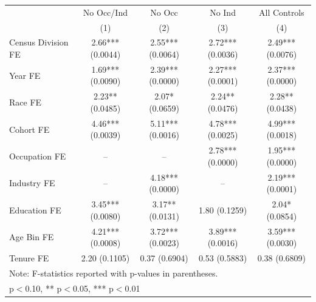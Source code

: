 \begin{tabular}{lcccc}
\hline\hline
 & No Occ/Ind & No Occ & No Ind & All Controls \\
 & (1) & (2) & (3) & (4) \\
\hline
Census Division FE&2.66*** (0.0044)&2.55*** (0.0064)&2.72*** (0.0036)&2.49*** (0.0076)\\
Year FE&1.69*** (0.0090)&2.39*** (0.0000)&2.27*** (0.0001)&2.37*** (0.0000)\\
Race FE&2.23** (0.0485)&2.07* (0.0659)&2.24** (0.0476)&2.28** (0.0438)\\
Cohort FE&4.46*** (0.0039)&5.11*** (0.0016)&4.78*** (0.0025)&4.99*** (0.0018)\\
Occupation FE&--&--&2.78*** (0.0000)&1.95*** (0.0000)\\
Industry FE&--&4.18*** (0.0000)&--&2.19*** (0.0001)\\
Education FE&3.45*** (0.0080)&3.17** (0.0131)&1.80 (0.1259)&2.04* (0.0854)\\
Age Bin FE&4.21*** (0.0008)&3.72*** (0.0023)&3.89*** (0.0016)&3.59*** (0.0030)\\
Tenure FE&2.20 (0.1105)&0.37 (0.6904)&0.53 (0.5883)&0.38 (0.6809)\\
\hline
\multicolumn{5}{l}{\footnotesize Note: F-statistics reported with p-values in parentheses.} \\
\multicolumn{5}{l}{\footnotesize * p$<$0.10, ** p$<$0.05, *** p$<$0.01} \\
\hline\hline
\end{tabular}
